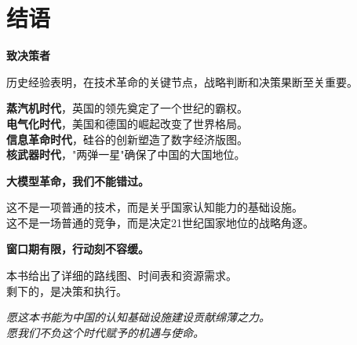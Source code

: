 \section{结语}

\textbf{致决策者}

历史经验表明，在技术革命的关键节点，战略判断和决策果断至关重要。

\textbf{蒸汽机时代}，英国的领先奠定了一个世纪的霸权。\\
\textbf{电气化时代}，美国和德国的崛起改变了世界格局。\\
\textbf{信息革命时代}，硅谷的创新塑造了数字经济版图。\\
\textbf{核武器时代}，"两弹一星"确保了中国的大国地位。

\textbf{大模型革命，我们不能错过。}

这不是一项普通的技术，而是关乎国家认知能力的基础设施。\\
这不是一场普通的竞争，而是决定21世纪国家地位的战略角逐。

\textbf{窗口期有限，行动刻不容缓。}

本书给出了详细的路线图、时间表和资源需求。\\
剩下的，是决策和执行。

\textit{愿这本书能为中国的认知基础设施建设贡献绵薄之力。}\\
\textit{愿我们不负这个时代赋予的机遇与使命。}


